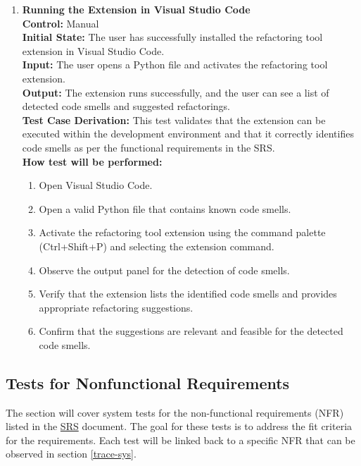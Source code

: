 \documentclass[12pt, titlepage]{article}
\newcommand{\SRS}{\href{https://github.com/ssm-lab/capstone--source-code-optimizer/blob/main/docs/SRS/SRS.pdf}{SRS}}
\begin{document}
\begin{enumerate}[label={\bf \textcolor{Maroon}{test-FR-IE-\arabic*}}, wide=0pt, font=\itshape]
  \item \textbf{Running the Extension in Visual Studio Code}\\[2mm]
    \textbf{Control:} Manual\\
    \textbf{Initial State:} The user has successfully installed the refactoring tool extension in Visual Studio Code.\\
    \textbf{Input:} The user opens a Python file and activates the refactoring tool extension.\\
    \textbf{Output:} The extension runs successfully, and the user can see a list of detected code smells and suggested refactorings.\\[2mm]
    \textbf{Test Case Derivation:} This test validates that the extension can be executed within the development environment and that it correctly identifies code smells as per the functional requirements in the SRS.\\[2mm]
    \textbf{How test will be performed:}
    \begin{enumerate}[label=\arabic*.]
        \item Open Visual Studio Code.
        \item Open a valid Python file that contains known code smells.
        \item Activate the refactoring tool extension using the command palette (Ctrl+Shift+P) and selecting the extension command.
        \item Observe the output panel for the detection of code smells.
        \item Verify that the extension lists the identified code smells and provides appropriate refactoring suggestions.
        \item Confirm that the suggestions are relevant and feasible for the detected code smells.
    \end{enumerate}
\end{enumerate}

\subsection{Tests for Nonfunctional Requirements}

The section will cover system tests for the non-functional requirements (NFR) listed in the \SRS \hspace{1pt} document\cite{SRS}. The goal for these tests is to address the fit criteria for the requirements. Each test will be linked back to a specific NFR that can be observed in section \ref{trace-sys}.
\end{document}
